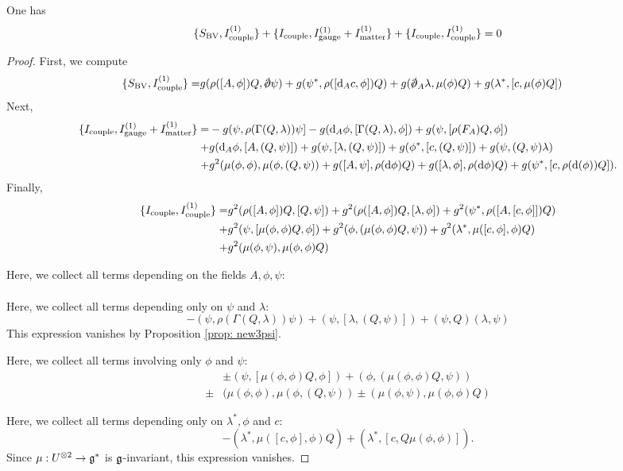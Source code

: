 \documentclass[10pt, oneside]{article}
\begin{document}
\begin{lem} One has
\[
\{S_{\rm BV} , I^{(1)}_{\rm couple}\} + \{I_{\rm couple}, I^{(1)}_{\rm gauge} + I^{(1)}_{\rm matter}\} + \{I_{\rm couple}, I^{(1)}_{\rm couple}\}  =  0 
\]
\end{lem}
\begin{proof}
First, we compute
\begin{align*}
\{S_{\rm BV} , I^{(1)}_{\rm couple}\} = & g (\rho([A, \phi]) Q, \sd \dd \psi) + g (\psi^*, \rho([\d_A c, \phi]) Q) + g (\sd \dd_A \lambda, \mu(\phi) Q) + g (\lambda^*, [c, \mu(\phi) Q]) 
\end{align*}
Next,
\begin{align*}
\{I_{\rm couple} , I^{(1)}_{\rm gauge} + I^{(1)}_{\rm matter}\} = & - g (\psi, \rho(\Gamma(Q, \lambda)) \psi] - g ({\rm d}_A \phi, [\Gamma(Q, \lambda), \phi]) + g (\psi, [\rho(F_A) Q, \phi]) \\ + & g ({\rm d}_A \phi, [A, (Q, \psi)]) + g (\psi, [\lambda, (Q, \psi)]) + g (\phi^*, [c, (Q,\psi)]) +  g (\psi, (Q  , \psi) \lambda) \\ + & g^2 (\mu(\phi, \phi) , \mu(\phi, (Q, \psi)) + g ([A, \psi] , \rho({\rm d} \phi)Q) + g ([\lambda, \phi] , \rho ({\rm d} \phi) Q) + g (\psi^*, [c , \rho({\rm d}(\phi)) Q]) . 
\end{align*}
Finally,
\begin{align*}
\{I_{\rm couple}, I^{(1)}_{\rm couple}\} = & g^2 (\rho([A,\phi]) Q, [Q,\psi]) + g^2 (\rho([A,\phi]) Q, [\lambda, \phi]) + g^2 (\psi^*, \rho([A, [c,\phi]]) Q) \\ + & g^2 (\psi, [\mu(\phi, \phi) Q, \phi]) + g^2  (\phi, (\mu(\phi, \phi)Q, \psi) ) + g^2 (\lambda^*, \mu([c,\phi], \phi) Q) \\ + & g^2 (\mu(\phi, \psi), \mu(\phi,\phi) Q)
\end{align*}

Here, we collect all terms depending on the fields $A, \phi, \psi$:
\begin{align*}
\end{align*} 

Here, we collect all terms depending only on $\psi$ and $\lambda$:
\[
- (\psi, \rho(\Gamma(Q, \lambda)) \psi) + (\psi, [\lambda, (Q, \psi)]) + (\psi, Q) (\lambda, \psi)
\]
This expression vanishes by Proposition \ref{prop: new3psi}.

Here, we collect all terms involving only $\phi$ and $\psi$:
\begin{align*}
& \pm  (\psi, [\mu(\phi, \phi) Q, \phi]) +  (\phi, (\mu(\phi, \phi)Q, \psi) ) \\
\pm & (\mu(\phi, \phi) , \mu(\phi, (Q, \psi)) \pm (\mu(\phi, \psi), \mu(\phi,\phi)Q)
\end{align*}

Here, we collect all terms depending only on $\lambda^*, \phi$ and $c$:
\[
- (\lambda^*, \mu([c, \phi], \phi) Q) + (\lambda^*, [c, Q \mu(\phi,\phi)]) .
\]
Since $\mu : U^{\otimes 2} \to \mathfrak g^*$ is $\mathfrak g$-invariant, this expression vanishes. 
\end{proof}
\end{document}
